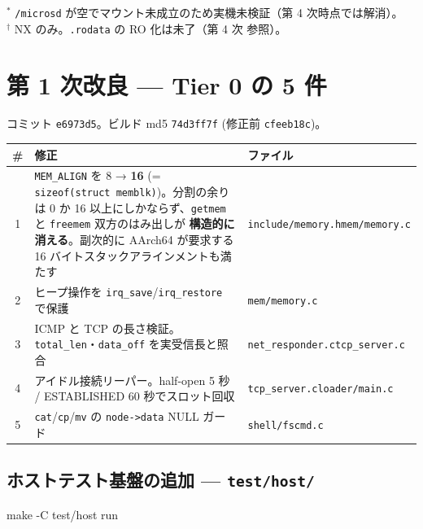 \documentclass[a4paper,11pt]{ltjsarticle}
\begin{document}
\vspace{-0.6em}
{\small $^{*}$ \texttt{/microsd} が空でマウント未成立のため実機未検証（第 4 次時点では解消）。\\
$^{\dagger}$ NX のみ。\texttt{.rodata} の RO 化は未了（第 4 次 参照）。}

\section{第 1 次改良 --- Tier 0 の 5 件}

コミット \texttt{e6973d5}。ビルド md5 \texttt{74d3ff7f} (修正前 \texttt{cfeeb18c})。

\begin{center}\small
\begin{tabular}{@{}c p{10.4cm} p{3.2cm}@{}}
\toprule
\textbf{\#} & \textbf{修正} & \textbf{ファイル}\\ \midrule
1 & \texttt{MEM\_ALIGN} を 8 → \textbf{16} (= \texttt{sizeof(struct memblk)})。分割の余りは
    0 か 16 以上にしかならず、\texttt{getmem} と \texttt{freemem} 双方のはみ出しが
    \textbf{構造的に消える}。副次的に AArch64 が要求する 16 バイトスタックアラインメントも満たす
  & \texttt{include/memory.h}\newline \texttt{mem/memory.c}\\
2 & ヒープ操作を \texttt{irq\_save}/\texttt{irq\_restore} で保護 & \texttt{mem/memory.c}\\
3 & ICMP と TCP の長さ検証。\texttt{total\_len}・\texttt{data\_off} を実受信長と照合
  & \texttt{net\_responder.c}\newline \texttt{tcp\_server.c}\\
4 & アイドル接続リーパー。half-open 5 秒 / ESTABLISHED 60 秒でスロット回収
  & \texttt{tcp\_server.c}\newline \texttt{loader/main.c}\\
5 & \texttt{cat}/\texttt{cp}/\texttt{mv} の \texttt{node->data} NULL ガード & \texttt{shell/fscmd.c}\\
\bottomrule
\end{tabular}
\end{center}

\subsection{ホストテスト基盤の追加 --- \texttt{test/host/}}

\begin{code}
make -C test/host run
\end{code}
\end{document}
